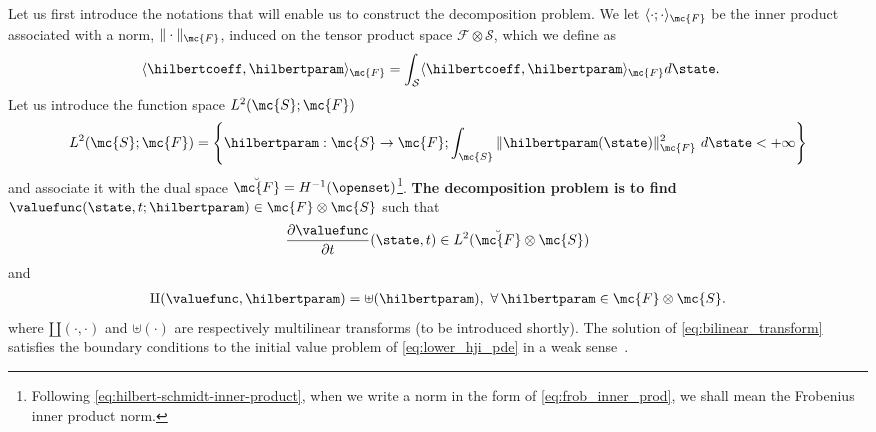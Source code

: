 Let us first introduce the notations that will enable us to construct the decomposition problem. We let $\langle \cdot; \cdot \rangle_{\mc{F}}$  be the inner product associated with a norm, $\| \cdot \|_{\mc{F}}$, induced on the tensor product space $\mathcal{F} \otimes \mathcal{S}$, which we define as 
%
\begin{align}
	\langle &\hilbertcoeff, \hilbertparam \rangle_{\mc{F}} = \int_{\mathcal{S}} \langle \hilbertcoeff, \hilbertparam \rangle_{\mc{F}} d\state.
	\label{eq:frob_inner_prod}
\end{align}
%
Let us introduce the function space $L^2(\mc{S}; \mc{F})$
%
\begin{align}
	L^2(\mc{S}; \mc{F}) = \left\{\hilbertparam: \mc{S} \rightarrow \mc{F}; \int_{\mc{S}} \| \hilbertparam(\state)\|^2_{\mc{F}} \,\, d\state < +\infty \right\}
\end{align}
%
and associate it with the dual space $\breve{\mc{F}} = H^{-1}(\openset)$\footnote{Following \eqref{eq:hilbert-schmidt-inner-product}, when we write a norm in the form of \eqref{eq:frob_inner_prod}, we shall mean the Frobenius inner product norm.}. \textbf{The decomposition problem is to find}
%
 $\valuefunc(\state,t; \hilbertparam) \in \mc{F} \otimes \mc{S}$ such that 
%
\begin{align}
	\dfrac{\partial \valuefunc}{\partial t}(\state, t) \in L^2(\breve{\mc{F}} \otimes \mc{S})
\end{align}
%
and 
%
\begin{align}
	\amalg(\valuefunc, \hilbertparam) = \mathbf{\uplus}(\hilbertparam), \,\, \forall \, \hilbertparam \in \mc{F} \otimes \mc{S}.
	\label{eq:bilinear_transform}
\end{align}
%
where $\amalg(\cdot, \cdot)$ and $\uplus(\cdot)$ are respectively multilinear transforms (to be introduced shortly). The solution of \eqref{eq:bilinear_transform} satisfies the boundary conditions to the initial value problem of \cf \eqref{eq:lower_hji_pde} in a weak sense~\cite{Nouy2010}. 

